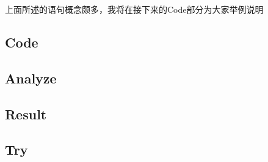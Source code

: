 上面所述的语句概念颇多，我将在接下来的Code部分为大家举例说明

\subsection{Code}

\subsection{Analyze}

\subsection{Result}

\subsection{Try}

